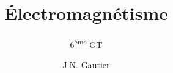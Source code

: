 

\subject{Physique(2h)}
\title{\Huge{Électromagnétisme}}
\subtitle{6\textsuperscript{ème} GT}
\author {J.N. Gautier}
\date{}


\maketitle



\tableofcontents

